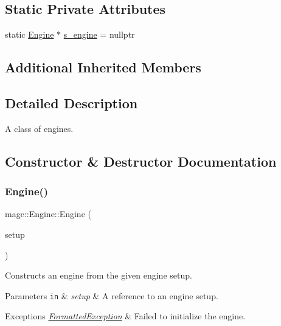 \subsection*{Static Private Attributes}
\begin{DoxyCompactItemize}
\item 
static \hyperlink{classmage_1_1_engine}{Engine} $\ast$ \hyperlink{classmage_1_1_engine_a95fd10c9b9dfe0fc9cbbcb441c910240}{s\+\_\+engine} = nullptr
\end{DoxyCompactItemize}
\subsection*{Additional Inherited Members}


\subsection{Detailed Description}
A class of engines. 

\subsection{Constructor \& Destructor Documentation}
\hypertarget{classmage_1_1_engine_a99770cbb017b29c284d7f8e4c7e2b84c}{}\label{classmage_1_1_engine_a99770cbb017b29c284d7f8e4c7e2b84c} 
\subsubsection{\texorpdfstring{Engine()}{Engine()}\hspace{0.1cm}{\footnotesize\ttfamily [1/3]}}
{\footnotesize\ttfamily mage\+::\+Engine\+::\+Engine (\begin{DoxyParamCaption}\item[{const \hyperlink{structmage_1_1_engine_setup}{Engine\+Setup} \&}]{setup }\end{DoxyParamCaption})\hspace{0.3cm}{\ttfamily [explicit]}}

Constructs an engine from the given engine setup.


\begin{DoxyParams}[1]{Parameters}
\mbox{\tt in}  & {\em setup} & A reference to an engine setup. \\
\hline
\end{DoxyParams}

\begin{DoxyExceptions}{Exceptions}
{\em \hyperlink{classmage_1_1_formatted_exception}{Formatted\+Exception}} & Failed to initialize the engine. \\
\hline
\end{DoxyExceptions}
\hypertarget{classmage_1_1_engine_afd2f4f32b2e803f59521aafe1924f0ba}{}\label{classmage_1_1_engine_afd2f4f32b2e803f59521aafe1924f0ba} 
